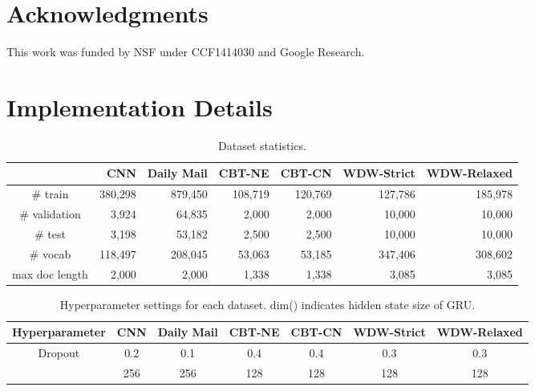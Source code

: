 \documentclass[11pt,a4paper]{article}
\begin{document}
\section*{Acknowledgments}
This work was funded by NSF under CCF1414030 and Google Research.




\appendix

\vspace{-0.05in}
\section{Implementation Details}
\label{app:implementation}
\begin{table*}[t]
\centering
\caption{\small Dataset statistics.}
\label{tab:data}
\begin{tabular}{@{}crrrrrr@{}}
\toprule
 & \textbf{CNN} & \textbf{Daily Mail} & \textbf{CBT-NE} & \textbf{CBT-CN} & \textbf{WDW-Strict} & \textbf{WDW-Relaxed} \\ \midrule
\# train              & 380,298             & 879,450               & 108,719              & 120,769  & 	 127,786	&	185,978           \\
\# validation        & 3,924             & 64,835              & 2,000             & 2,000  	&	10,000	&	10,000           \\
\# test           &  3,198            & 53,182               & 2,500              & 2,500  	&	10,000	&	10,000            \\
\# vocab           & 118,497             & 208,045               & 53,063              & 53,185 	&	347,406	&	 308,602             \\ 
max doc length	& 2,000	&	2,000 &	1,338 &	1,338 & 3,085	&	3,085 \\ \bottomrule
\end{tabular}
\end{table*}

\begin{table*}[t]
\centering
\caption{\small Hyperparameter settings for each dataset. dim() indicates hidden state size of GRU.}
\label{tab:params}
\begin{tabular}{@{}ccccccc@{}}
\toprule
\textbf{Hyperparameter} & \textbf{CNN} & \textbf{Daily Mail} & \textbf{CBT-NE} & \textbf{CBT-CN} & \textbf{WDW-Strict} & \textbf{WDW-Relaxed} \\ \midrule
Dropout	&	0.2	&	0.1	&	0.4	&	0.4	&	0.3	&	0.3	\\
 &	256	&	256	&	128	&	128	&	128	&	128	\\ \bottomrule
\end{tabular}
\end{table*}
\end{document}
